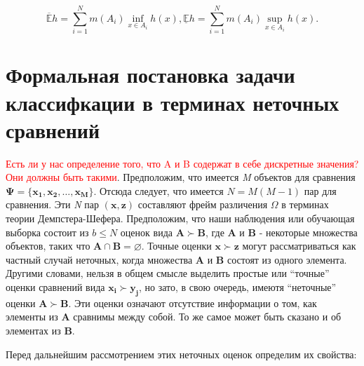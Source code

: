 \documentclass[12pt,a4paper,oneside]{article}
\begin{document}
\[
\mathbb{\overline{E}} h = \sum \limits_{i=1}^N m(A_i) \inf_{x \in A_i} h(x), 
\mathbb{\underline{E}} h = \sum \limits_{i=1}^N m(A_i) \sup_{x \in A_i} h(x).
\]


\section{Формальная постановка задачи классифкации в терминах неточных сравнений}
\label{sec:classification_problem_by_imprecise_comparisons}

\par
\textcolor{red}{Есть ли у нас определение того, что A и B содержат в себе дискретные значения? Они должны быть такими}. 
Предположим, что имеется \emph{M} объектов для сравнения \(\mathbf{\Psi} = \{\mathbf{x_1}, \mathbf{x_2}, \dots, \mathbf{x_M}\}\). 
Отсюда следует, что имеется \(N = M(M - 1)\) пар для сравнения. 
Эти \emph{N} пар \((\mathbf{x}, \mathbf{z})\) составляют фрейм различения \(\Omega\) в терминах теории Демпстера-Шефера. 
Предположим, что наши наблюдения или обучающая выборка состоит из \(b \leq N\) оценок вида \(\mathbf{A} \succ \mathbf{B}\), где \(\mathbf{A}\) и \(\mathbf{B}\) - некоторые множества объектов, таких что \(\mathbf{A} \cap \mathbf{B} = \varnothing\).  
Точные оценки \(\mathbf{x} \succ \mathbf{z}\) могут рассматриваться как частный случай неточных, когда множества \(\mathbf{A}\) и \(\mathbf{B}\) состоят из одного элемента. 
Другими словами, нельзя в общем смысле выделить простые или ``точные'' оценки сравнений вида \(\mathbf{x_i} \succ \mathbf{y_j}\), но зато, в свою очередь, имеютя ``неточные'' оценки \(\mathbf{A} \succ \mathbf{B}\). 
Эти оценки означают отсутствие информации о том, как элементы из \(\mathbf{A}\) сравнимы между собой. 
То же самое может быть сказано и об элементах из \(\mathbf{B}\). 

\par
Перед дальнейшим рассмотрением этих неточных оценок определим их свойства:
\end{document}
